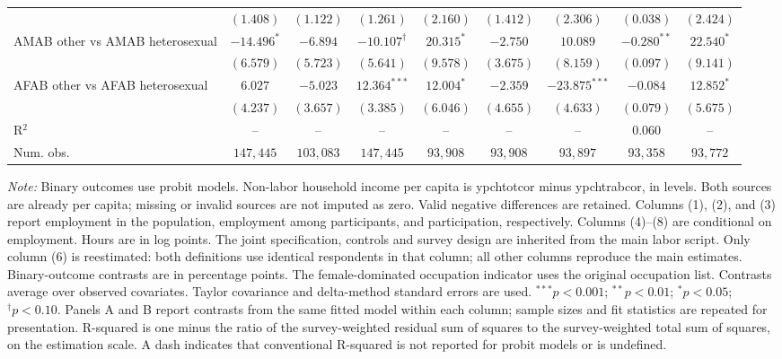 \begin{table}[htpb!]
{\begin{tabular}{l c c c c c c c c}
 & $(1.408)$ & $(1.122)$ & $(1.261)$ & $(2.160)$ & $(1.412)$ & $(2.306)$ & $(0.038)$ & $(2.424)$ \\
AMAB other vs AMAB heterosexual & $-14.496^{*}$ & $-6.894$ & $-10.107^{\dagger}$ & $20.315^{*}$ & $-2.750$ & $10.089$ & $-0.280^{**}$ & $22.540^{*}$ \\
 & $(6.579)$ & $(5.723)$ & $(5.641)$ & $(9.578)$ & $(3.675)$ & $(8.159)$ & $(0.097)$ & $(9.141)$ \\
AFAB other vs AFAB heterosexual & $6.027$ & $-5.023$ & $12.364^{***}$ & $12.004^{*}$ & $-2.359$ & $-23.875^{***}$ & $-0.084$ & $12.852^{*}$ \\
 & $(4.237)$ & $(3.657)$ & $(3.385)$ & $(6.046)$ & $(4.655)$ & $(4.633)$ & $(0.079)$ & $(5.675)$ \\
\hline
R$^2$ & -- & -- & -- & -- & -- & -- & $0.060$ & -- \\
Num. obs. & $147,445$ & $103,083$ & $147,445$ & $93,908$ & $93,908$ & $93,897$ & $93,358$ & $93,772$ \\
\hline
\end{tabular}%
}
\par\vspace{1ex}
\begin{minipage}{\textwidth}\footnotesize\raggedright
\textit{Note:} Binary outcomes use probit models. Non-labor household income per capita is ypchtotcor minus ypchtrabcor, in levels. Both sources are already per capita; missing or invalid sources are not imputed as zero. Valid negative differences are retained. Columns (1), (2), and (3) report employment in the population, employment among participants, and participation, respectively. Columns (4)--(8) are conditional on employment. Hours are in log points. The joint specification, controls and survey design are inherited from the main labor script. Only column (6) is reestimated: both definitions use identical respondents in that column; all other columns reproduce the main estimates. Binary-outcome contrasts are in percentage points. The female-dominated occupation indicator uses the original occupation list. Contrasts average over observed covariates. Taylor covariance and delta-method standard errors are used. $^{***}p<0.001$; $^{**}p<0.01$; $^{*}p<0.05$; $^{\dagger}p<0.10$. Panels A and B report contrasts from the same fitted model within each column; sample sizes and fit statistics are repeated for presentation. R-squared is one minus the ratio of the survey-weighted residual sum of squares to the survey-weighted total sum of squares, on the estimation scale. A dash indicates that conventional R-squared is not reported for probit models or is undefined.
\end{minipage}
\end{table}
